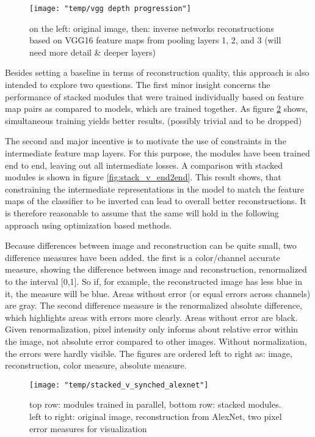 \documentclass{article}
\begin{document}
\begin{figure}
	\centering
	\texttt{[image: "temp/vgg depth progression"]}
	\caption{on the left: original image, then: inverse networks reconstructions based on VGG16 feature maps from pooling layers 1, 2, and 3 (will need more detail \& deeper layers)}
	\label{fig:invert_net_progression}
\end{figure}

Besides setting a baseline in terms of reconstruction quality, this approach is also intended to explore two questions. The first minor insight concerns the performance of stacked modules that were trained individually based on feature map pairs as compared to models, which are trained together. As figure \ref{fig:stack_v_sync} shows, simultaneous training yields better results. (possibly trivial and to be dropped)

The second and major incentive is to motivate the use of constraints in the intermediate feature map layers. For this purpose, the modules have been trained end to end, leaving out all intermediate losses. A comparison with stacked modules is shown in figure \ref{fig:stack_v_end2end}. This result shows, that constraining the intermediate representations in the model to match the feature maps of the classifier to be inverted can lead to overall better reconstructions. It is therefore reasonable to assume that the same will hold in the following approach using optimization based methods.

Because differences between image and reconstruction can be quite small, two difference measures have been added. the first is a color/channel accurate measure, showing the difference between image and reconstruction, renormalized to the interval [0,1]. So if, for example, the reconstructed image has less blue in it, the measure will be blue. Areas without error (or equal errors across channels) are gray. The second difference measure is the renormalized absolute difference, which highlights areas with errors more clearly. Areas without error are black. Given renormalization,  pixel intensity only informs about relative error within the image, not absolute error compared to other images. Without normalization, the errors were hardly visible. The figures are ordered left to right as: image, reconstruction, color measure, absolute measure. 

\begin{figure}
	\centering
	\texttt{[image: "temp/stacked\_v\_synched\_alexnet"]}
	\caption{top row: modules trained in parallel, bottom row: stacked modules.
		left to right: original image, reconstruction from AlexNet, two pixel error measures for visualization}
	\label{fig:stack_v_sync}
\end{figure}
\end{document}
